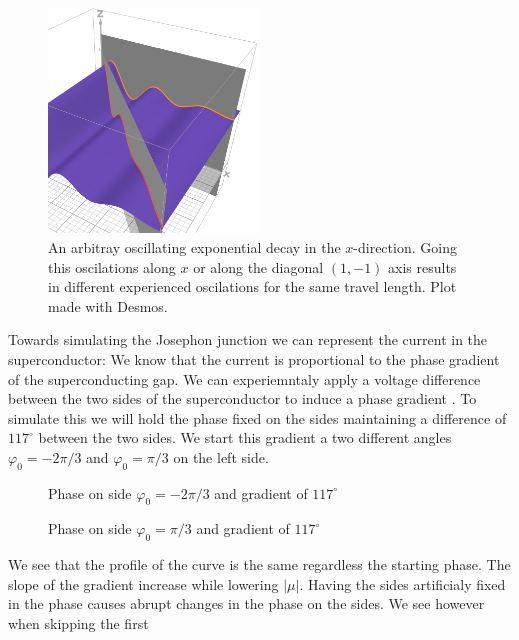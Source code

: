 \documentclass[..\main.tex]{subfile}
\begin{document}
\begin{figure}[H]
  \centering
  \includegraphics[width=0.5\textwidth]{Ressources/CooperPairsOrient.PNG}
  \caption{An arbitray oscillating exponential decay in the $x$-direction. Going this oscilations along $x$ or along the diagonal $(1,-1)$ axis results in different
  experienced oscilations for the same travel length. Plot made with Desmos.}
\end{figure}
Towards simulating the Josephon junction we can represent the current in the superconductor:  
We know  that the current is proportional to the phase gradient of the superconducting gap.
We can experiemntaly apply a voltage difference between the two sides of the superconductor to induce a phase gradient .
To simulate this we will hold the phase fixed on the sides maintaining a difference of $117^{\circ}$ between the two sides.
We start this gradient a two different angles $\varphi_0 = -2\pi/3$ and $\varphi_0 = \pi/3$ on the left side.
\begin{figure}[H]
    
    \caption{Phase on side $\varphi_0 = -2\pi/3$ and gradient of $117^{\circ}$}
\end{figure}
\begin{figure}[H]
    
    \caption{Phase on side $\varphi_0 = \pi/3$ and gradient of $117^{\circ}$}
\end{figure}
We see that the profile of the curve is the same regardless the starting phase. The slope of the gradient increase while lowering $|\mu|$.
Having the sides artificialy fixed in the phase causes abrupt changes in the phase on the sides. We see however when skipping the first
\end{document}
